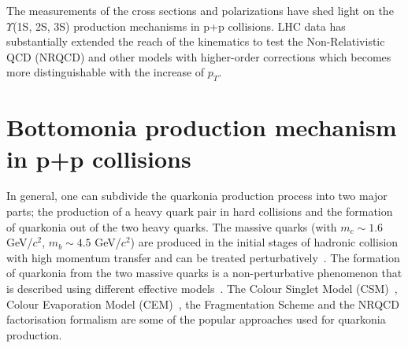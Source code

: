 The measurements of the cross sections and polarizations have shed light on the
$\Upsilon$(1S, 2S, 3S) production mechanisms in p+p collisions.
LHC data has substantially extended the reach of the kinematics to test the
Non-Relativistic QCD (NRQCD) and other models with
higher-order corrections which becomes more distinguishable with the increase of $p_{T}$.


\section{Bottomonia production mechanism in p+p collisions}
\label{sec:Bottomonia_pp_th}

In general, one can subdivide the quarkonia production process into two major parts;
the production of a heavy quark pair in hard collisions and the formation of quarkonia
out of the two heavy quarks.
  The massive quarks (with $m_c\sim 1.6$ GeV/$c^2$, $m_b\sim 4.5$ GeV/$c^2$) are produced
in the initial stages of hadronic collision with high momentum transfer and 
can be treated perturbatively~\cite{Nason:1989zy}. The formation of quarkonia
from the two massive quarks is a non-perturbative phenomenon that is
described using different effective models~\cite{Bodwin:1994jh,Brambilla:2014jmp}.
The Colour Singlet Model (CSM)~\cite{Einhorn:1975ua,Berger:1980ni},
Colour Evaporation Model (CEM)~\cite{Fritzsch:1977ay,Amundson:1995em}, the Fragmentation
Scheme and the NRQCD factorisation formalism are some of the popular
approaches used for quarkonia production.


